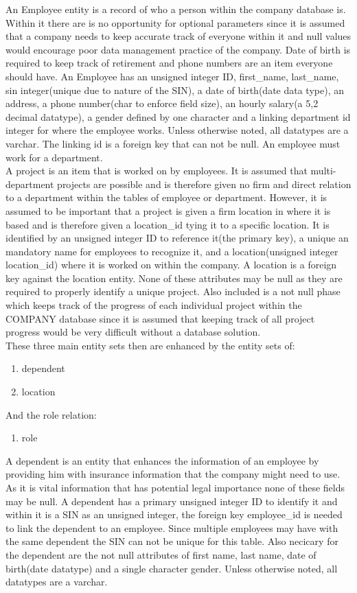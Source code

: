 \documentclass[11pt,letterpaper]{article}
\begin{document}
An Employee entity is a record of who a person within the company database is. Within it there are is no opportunity for optional parameters since it is assumed that a company needs to keep accurate track of everyone within it and null values would encourage poor data management practice of the company. Date of birth is required to keep track of retirement and phone numbers are an item everyone should have. An Employee has an unsigned integer ID, first\_name, last\_name, sin integer(unique due to nature of the SIN), a date of birth(date data type), an address, a phone number(char to enforce field size), an hourly salary(a 5,2 decimal datatype), a gender defined by one character and a linking department id integer for where the employee works. Unless otherwise noted, all datatypes are a varchar. The linking id is a foreign key that can not be null. An employee must work for a department.\\

A project is an item that is worked on by employees. It is assumed that multi-department projects are possible and is therefore given no firm and direct relation to a department within the tables of employee or department. However, it is assumed to be important that a project is given a firm location in where it is based and is therefore given a location\_id tying it to a specific location. It is identified by an unsigned integer ID to reference it(the primary key), a unique an mandatory name for employees to recognize it, and a location(unsigned integer location\_id) where it is worked on within the company. A location is a foreign key against the location entity. None of these attributes may be null as they are required to properly identify a unique project. Also included is a not null phase which keeps track of the progress of each individual project within the COMPANY database since it is assumed that keeping track of all project progress would be very difficult without a database solution.\\

These three main entity sets then are enhanced by the entity sets of:
\begin{enumerate}[]
	\item dependent 
	\item location
\end{enumerate}
And the role relation:
\begin{enumerate}[]
	\item role 
\end{enumerate}
A dependent is an entity that enhances the information of an employee by providing him with insurance information that the company might need to use. As it is vital information that has potential legal importance none of these fields may be null. A dependent has a primary unsigned integer ID to identify it and within it is a SIN as an unsigned integer, the foreign key employee\_id is needed to link the dependent to an employee. Since multiple employees may have with the same dependent the SIN can not be unique for this table. Also necicary for the dependent are the not null attributes of first name, last name, date of birth(date datatype) and a single character gender.  Unless otherwise noted, all datatypes are a varchar. \\
\end{document}
